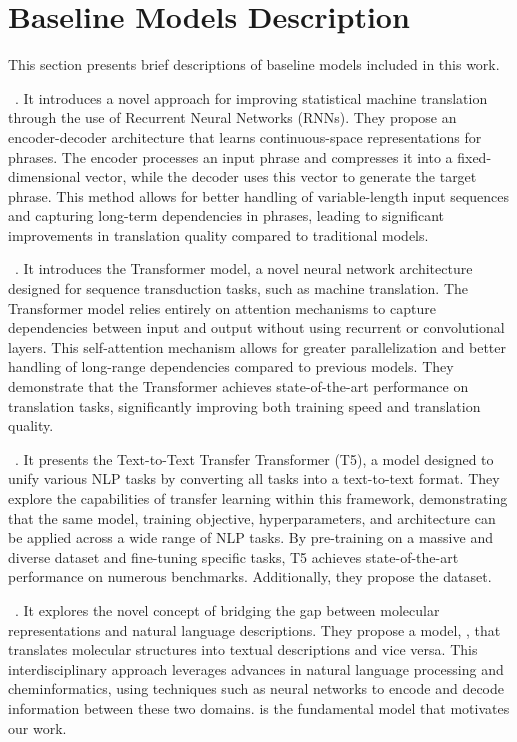 \section{Baseline Models Description}
\label{sec:appendix_baseline}

This section presents brief descriptions of baseline models included in this work. 

~\cite{CMGBBSB14}.
It introduces a novel approach for improving statistical machine translation through the use of Recurrent Neural Networks (RNNs). 
They propose an encoder-decoder architecture that learns continuous-space representations for phrases. The encoder processes an input phrase and compresses it into a fixed-dimensional vector, while the decoder uses this vector to generate the target phrase. 
This method allows for better handling of variable-length input sequences and capturing long-term dependencies in phrases, leading to significant improvements in translation quality compared to traditional models.

~\cite{VSPUJGKP17}.
It introduces the Transformer model, a novel neural network architecture designed for sequence transduction tasks, such as machine translation. 
The Transformer model relies entirely on attention mechanisms to capture dependencies between input and output without using recurrent or convolutional layers. 
This self-attention mechanism allows for greater parallelization and better handling of long-range dependencies compared to previous models. 
They demonstrate that the Transformer achieves state-of-the-art performance on translation tasks, significantly improving both training speed and translation quality. 

~\cite{RSRLNMZLL20}.
It presents the Text-to-Text Transfer Transformer (T5), a model designed to unify various NLP tasks by converting all tasks into a text-to-text format. 
They explore the capabilities of transfer learning within this framework, demonstrating that the same model, training objective, hyperparameters, and architecture can be applied across a wide range of NLP tasks. 
By pre-training on a massive and diverse dataset and fine-tuning specific tasks, T5 achieves state-of-the-art performance on numerous benchmarks. 
Additionally, they propose the \olddataset dataset. 

\spara{\oldmodel}~\cite{ELRHCJ22}.
It explores the novel concept of bridging the gap between molecular representations and natural language descriptions. 
They propose a model, \oldmodel, that translates molecular structures into textual descriptions and vice versa. 
This interdisciplinary approach leverages advances in natural language processing and cheminformatics, using techniques such as neural networks to encode and decode information between these two domains. 
\oldmodel is the fundamental model that motivates our work. 

